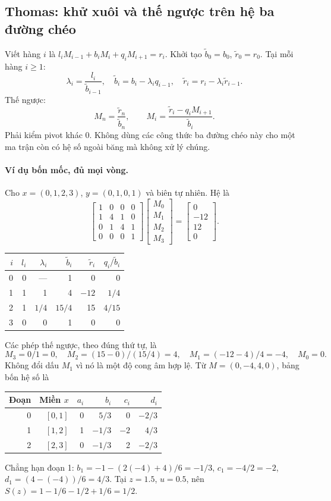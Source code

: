 \subsection{Thomas: khử xuôi và thế ngược trên hệ ba đường chéo}
\label{sec:spline-thomas}
Viết hàng $i$ là $l_iM_{i-1}+b_iM_i+q_iM_{i+1}=r_i$.
Khởi tạo $\widetilde b_0=b_0$, $\widetilde r_0=r_0$. Tại mỗi hàng $i\geq1$:
\[
\lambda_i=\frac{l_i}{\widetilde b_{i-1}},\quad
\widetilde b_i=b_i-\lambda_i q_{i-1},\quad
\widetilde r_i=r_i-\lambda_i\widetilde r_{i-1}.
\]
Thế ngược:
\[
M_n=\frac{\widetilde r_n}{\widetilde b_n},\qquad
M_i=\frac{\widetilde r_i-q_iM_{i+1}}{\widetilde b_i}.
\]
Phải kiểm pivot khác 0. Không dùng các công thức ba đường chéo này cho một ma trận còn có hệ số ngoài băng mà không xử lý chúng.

\paragraph{Ví dụ bốn mốc, đủ mọi vòng.}
Cho $x=(0,1,2,3)$, $y=(0,1,0,1)$ và biên tự nhiên. Hệ là
\[
\begin{bmatrix}1&0&0&0\\1&4&1&0\\0&1&4&1\\0&0&0&1\end{bmatrix}
\begin{bmatrix}M_0\\M_1\\M_2\\M_3\end{bmatrix}
=\begin{bmatrix}0\\-12\\12\\0\end{bmatrix}.
\]
\begin{center}
\begin{tabular}{rrrrrr}
\toprule
$i$&$l_i$&$\lambda_i$&$\widetilde b_i$&$\widetilde r_i$&$q_i/\widetilde b_i$\\ \midrule
0&0&---&1&0&0\\
1&1&1&4&$-12$&$1/4$\\
2&1&$1/4$&$15/4$&15&$4/15$\\
3&0&0&1&0&0\\ \bottomrule
\end{tabular}\end{center}
Các phép thế ngược, theo đúng thứ tự, là
\[
M_3=0/1=0,\quad M_2=(15-0)/(15/4)=4,
\quad M_1=(-12-4)/4=-4,\quad M_0=0.
\]
Không đổi dấu $M_1$ vì nó là một độ cong âm hợp lệ.
Từ $M=(0,-4,4,0)$, bảng bốn hệ số là
\begin{center}
\begin{tabular}{rrrrrr}
\toprule
Đoạn & Miền $x$ & $a_i$ & $b_i$ & $c_i$ & $d_i$\\ \midrule
0&$[0,1]$&0&$5/3$&0&$-2/3$\\
1&$[1,2]$&1&$-1/3$&$-2$&$4/3$\\
2&$[2,3]$&0&$-1/3$&2&$-2/3$\\ \bottomrule
\end{tabular}\end{center}
Chẳng hạn đoạn 1:
$b_1=-1-(2(-4)+4)/6=-1/3$, $c_1=-4/2=-2$, $d_1=(4-(-4))/6=4/3$.
Tại $z=1.5$, $u=0.5$, nên $S(z)=1-1/6-1/2+1/6=1/2$.

